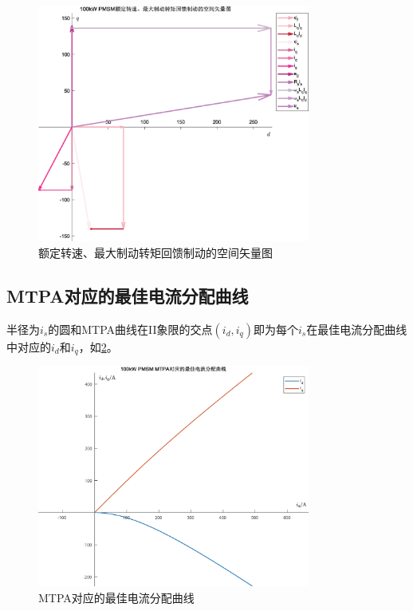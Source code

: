 \documentclass[UTF8]{ctexart}
\numberwithin{figure}{section}
\numberwithin{table}{section}
\begin{document}
\begin{figure}[htbp]
	\centering
	\includegraphics[width=0.8\textwidth]{8}
	\caption{额定转速、最大制动转矩回馈制动的空间矢量图}
	\label{spaceVec2}
\end{figure}

\subsection{MTPA对应的最佳电流分配曲线}
\label{subsection:2.9}

半径为$i_s$的圆和MTPA曲线在II象限的交点$(i_d,i_q)$即为每个$i_s$在最佳电流分配曲线中对应的$i_d$和$i_q$，如\cref{MTPACurDiv}。

\begin{figure}[htbp]
	\centering
	\includegraphics[width=0.8\textwidth]{9}
	\caption{MTPA对应的最佳电流分配曲线}
	\label{MTPACurDiv}
\end{figure}
\end{document}
